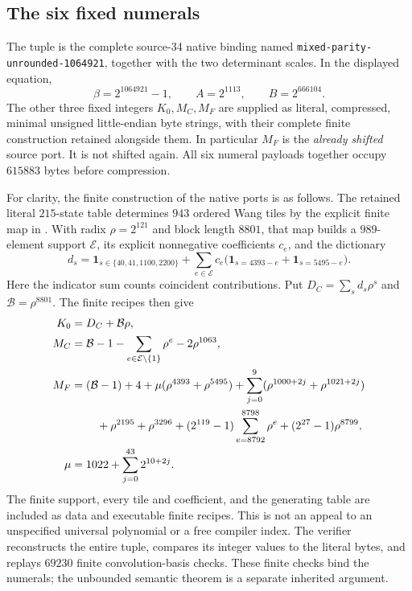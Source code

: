 \subsection{The six fixed numerals}
\label{int-coefficients}

The tuple is the complete source-34 native binding named
\texttt{mixed-parity-unrounded-1064921}, together with the two determinant
scales.  In the displayed equation,
\[
 \beta=2^{1064921}-1,\qquad A=2^{1113},\qquad B=2^{666104}.
\]
The other three fixed integers $K_0,M_C,M_F$ are supplied as literal,
compressed, minimal unsigned little-endian byte strings, with their
complete finite construction retained alongside them.  In particular
$M_F$ is the \emph{already shifted} source port.  It is not shifted again.
All six numeral payloads together occupy $615883$ bytes before compression.

For clarity, the finite construction of the native ports is as follows.
The retained literal $215$-state table determines $943$ ordered Wang tiles
by the explicit finite map in
.
With radix $\rho=2^{121}$ and block length $8801$, that map builds a
$989$-element support $\mathcal E$, its explicit nonnegative coefficients
$c_e$, and the dictionary
\[
 d_s=\mathbf1_{s\in\{40,41,1100,2200\}}
      +\sum_{e\in\mathcal E}c_e
          \bigl(\mathbf1_{s=4393-e}+\mathbf1_{s=5495-e}\bigr).
\]
Here the indicator sum counts coincident contributions.  Put
$D_C=\sum_s d_s\rho^s$ and $\mathcal B=\rho^{8801}$.
The finite recipes then give
\begin{align*}
 K_0&=D_C+\mathcal B\rho,\\
 M_C&=\mathcal B-1
         -\sum_{e\in\mathcal E\setminus\{1\}}\rho^e
         -2\rho^{1063},\\
 M_F&=(\mathcal B-1)+4+
      \mu(\rho^{4393}+\rho^{5495})
      +\sum_{j=0}^{9}(\rho^{1000+2j}+\rho^{1021+2j})\\
     &\hspace{8mm}+\rho^{2195}+\rho^{3296}
       +(2^{119}-1)\sum_{e=8792}^{8798}\rho^e
       +(2^{27}-1)\rho^{8799},\\
 \mu&=1022+\sum_{j=0}^{43}2^{10+2j}.
\end{align*}
The finite support, every tile and coefficient, and the generating table
are included as data and executable finite recipes.  This is not an
appeal to an unspecified universal polynomial or a free compiler index.
The verifier reconstructs the entire tuple, compares its integer values
to the literal bytes, and replays $69230$ finite convolution-basis checks.
These finite checks bind the numerals; the unbounded semantic theorem is
a separate inherited argument.

